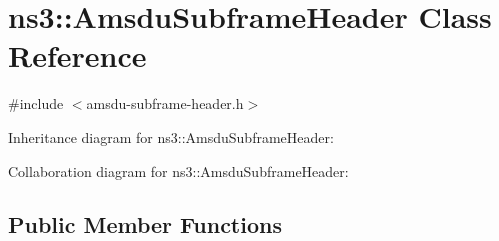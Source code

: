 \hypertarget{classns3_1_1AmsduSubframeHeader}{}\section{ns3\+:\+:Amsdu\+Subframe\+Header Class Reference}
\label{classns3_1_1AmsduSubframeHeader}


{\ttfamily \#include $<$amsdu-\/subframe-\/header.\+h$>$}



Inheritance diagram for ns3\+:\+:Amsdu\+Subframe\+Header\+:


Collaboration diagram for ns3\+:\+:Amsdu\+Subframe\+Header\+:
\subsection*{Public Member Functions}
